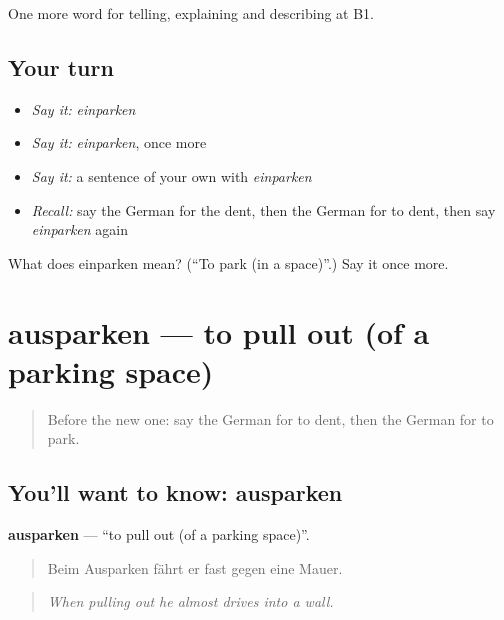 \begin{grammarlens}[title={What you've built}]
One more word for telling, explaining and describing at B1.
\end{grammarlens}

\subsection*{Your turn}
\begin{itemize}
\raggedright
  \item \emph{Say it:} \emph{einparken}
  \item \emph{Say it:} \emph{einparken}, once more
  \item \emph{Say it:} a sentence of your own with \emph{einparken}
  \item \emph{Recall:} say the German for the dent, then the German for to dent, then say \emph{einparken} again
\end{itemize}

\begin{tcolorbox}[breakable,colback=teal!4,colframe=teal!35!black,title={Before you move on}]
What does einparken mean? (\textquotedblleft{}To park (in a space)\textquotedblright{}.) Say it once more.
\end{tcolorbox}
\section[ausparken]{ausparken — to pull out (of a parking space)}

\label{lesson:GE-C406-ausparken}



\begin{quote}
Before the new one: say the German for to dent, then the German for to park.
\end{quote}

\subsection*{You'll want to know: ausparken}
\textbf{ausparken} — \textquotedblleft{}to pull out (of a parking space)\textquotedblright{}.

\begin{quote}
Beim Ausparken fährt er fast gegen eine Mauer.
\end{quote}

\begin{quote}
\emph{When pulling out he almost drives into a wall.}
\end{quote}

